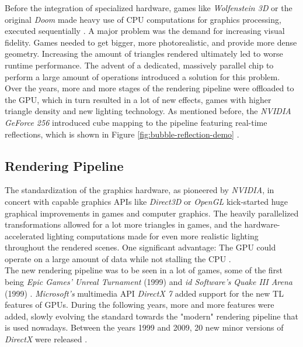 \noindent
Before the integration of specialized hardware, games like \emph{Wolfenstein 3D} or the 
original \emph{Doom} made heavy use of \ac{CPU} computations for graphics processing, 
executed sequentially \cite{NVIDIA1999}. A major problem was the demand for increasing 
visual fidelity. Games needed to get bigger, more photorealistic, and provide more dense 
geometry. Increasing the amount of triangles rendered ultimately led to worse runtime 
performance. The advent of a dedicated, massively parallel chip to perform a large amount of 
operations introduced a solution for this problem. Over the years, more and more stages of the 
rendering pipeline were offloaded to the \ac{GPU}, which in turn resulted in a lot of new effects, 
games with higher triangle density and new lighting technology. As mentioned before, the \emph{NVIDIA 
GeForce 256} introduced cube mapping to the pipeline featuring real-time reflections, which is 
shown in Figure \ref{fig:bubble-reflection-demo} \cite{Battaglia2024}.


\subsection*{Rendering Pipeline} \label{subsec-rendering-pipeline}

The standardization of the graphics hardware, as pioneered by \emph{NVIDIA}, in concert with capable 
graphics \ac{API}s like \emph{Direct3D} or \emph{OpenGL} kick-started huge graphical improvements in 
games and computer graphics. The heavily parallelized transformations allowed for a lot more triangles 
in games, and the hardware-accelerated lighting computations made for even more realistic lighting 
throughout the rendered scenes. One significant advantage: The \ac{GPU} could operate on a large amount 
of data while not stalling the \ac{CPU} \cite{Fenno2024}.\\

\noindent
The new rendering pipeline was to be seen in a lot of games, some of the first being \emph{Epic Games'} 
\emph{Unreal Turnament} (1999) and \emph{id Software's} \emph{Quake III Arena} (1999) \cite{UnrealTurnament, 
Quake3Arena}. \emph{Microsoft's} multimedia \ac{API} \emph{DirectX 7} added support for the new \ac{TL} 
features of \ac{GPU}s. During the following years, more and more features were added, slowly evolving the 
standard towards the "modern" rendering pipeline that is used nowadays. Between the years 1999 and 2009,
20 new minor versions of \emph{DirectX} were released \cite{WikiDirectX}.

